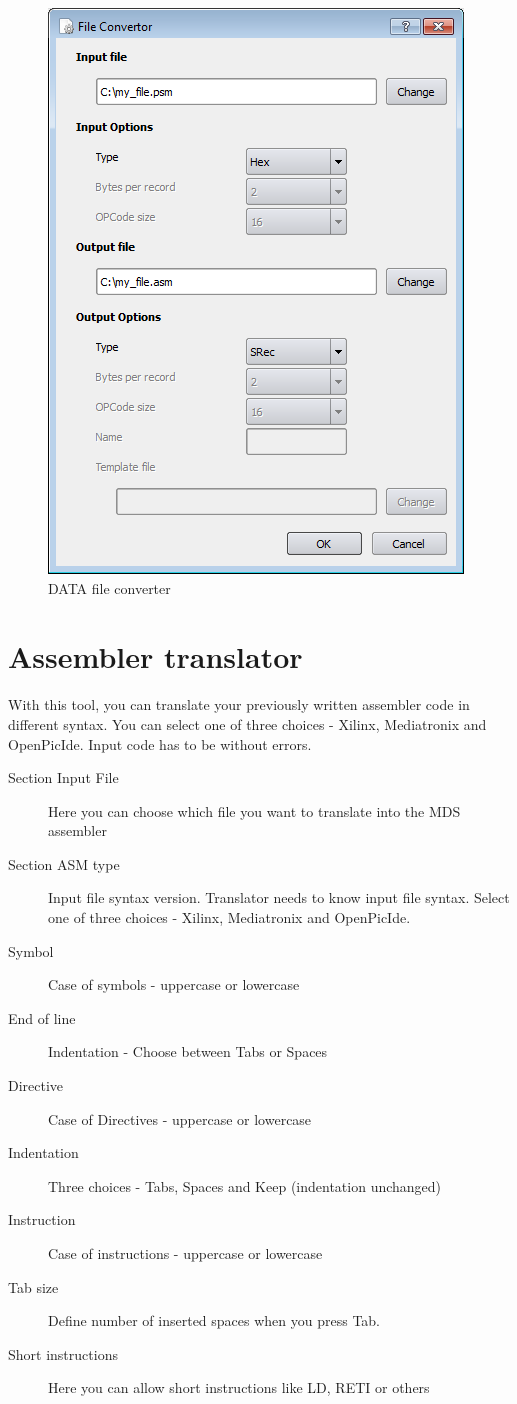     \begin{figure}[h]
        \centering{}
        \includegraphics[width=.5\textwidth]{img/DATA_converter.png}
        \caption{DATA file converter}
    \end{figure}

\clearpage
\section{Assembler translator}
    With this tool, you can translate your previously written assembler code in different syntax.
    You can select one of three choices - Xilinx, Mediatronix and OpenPicIde. Input code has to be without
    errors.
    \begin{description}
        \item[Section Input File] Here you can choose which file you want to translate into the MDS assembler
        \item[Section ASM type] Input file syntax version. Translator needs to know input file syntax. Select one of
             three choices - Xilinx, Mediatronix and OpenPicIde.
        \item[Symbol] Case of symbols - uppercase or lowercase
        \item[End of line] Indentation - Choose between Tabs or Spaces
        \item[Directive] Case of Directives - uppercase or lowercase
        \item[Indentation] Three choices - Tabs, Spaces and Keep (indentation unchanged)
        \item[Instruction] Case of instructions - uppercase or lowercase
        \item[Tab size]  Define number of inserted spaces when you press Tab.
        \item[Short instructions] Here you can allow short instructions like LD, RETI or others
    \end{description}


